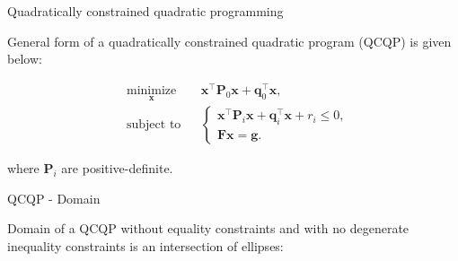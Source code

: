\documentclass{beamer}
\begin{document}
\begin{frame}{Quadratically constrained quadratic programming}
\begin{flushleft}

General form of a quadratically constrained quadratic program (QCQP) is given below:

%
\begin{equation}
\begin{aligned}
& \underset{\mathbf{x}}{\text{minimize}}
& & \mathbf{x}^\top \mathbf{P}_0 \mathbf{x} + \mathbf{q}_0^\top\mathbf{x}, \\
& \text{subject to}
& & \begin{cases}
    \mathbf{x}^\top \mathbf{P}_i \mathbf{x} + \mathbf{q}_i^\top\mathbf{x} + r_i \leq 0, \\
    \mathbf{F}\mathbf{x} = \mathbf{g}.
    \end{cases}
\end{aligned}
\end{equation}

where $\mathbf{P}_i$ are positive-definite.
 
\end{flushleft}
\end{frame}



\begin{frame}{QCQP - Domain}
\begin{flushleft}

Domain of a QCQP without equality constraints and with no degenerate inequality constraints is an intersection of ellipses:

\begin{figure} [h!]
\begin{center}

\end{center} 
\end{figure}
 
\end{flushleft}
\end{frame}
\end{document}
